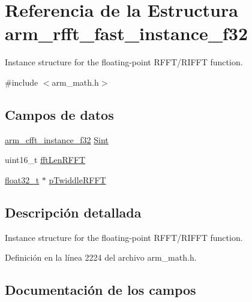 \hypertarget{structarm__rfft__fast__instance__f32}{}\section{Referencia de la Estructura arm\+\_\+rfft\+\_\+fast\+\_\+instance\+\_\+f32}
\label{structarm__rfft__fast__instance__f32}


Instance structure for the floating-\/point R\+F\+F\+T/\+R\+I\+F\+FT function.  




{\ttfamily \#include $<$arm\+\_\+math.\+h$>$}

\subsection*{Campos de datos}
\begin{DoxyCompactItemize}
\item 
\hyperlink{structarm__cfft__instance__f32}{arm\+\_\+cfft\+\_\+instance\+\_\+f32} \hyperlink{structarm__rfft__fast__instance__f32_aa8a05a9fabc3852e5d476152a5067e53}{Sint}
\item 
uint16\+\_\+t \hyperlink{structarm__rfft__fast__instance__f32_a174f8c72d545034e19ba4ced52b31353}{fft\+Len\+R\+F\+FT}
\item 
\hyperlink{arm__math_8h_a4611b605e45ab401f02cab15c5e38715}{float32\+\_\+t} $\ast$ \hyperlink{structarm__rfft__fast__instance__f32_a43370fe848d06993faf834da07ca91ce}{p\+Twiddle\+R\+F\+FT}
\end{DoxyCompactItemize}


\subsection{Descripción detallada}
Instance structure for the floating-\/point R\+F\+F\+T/\+R\+I\+F\+FT function. 

Definición en la línea 2224 del archivo arm\+\_\+math.\+h.



\subsection{Documentación de los campos}

